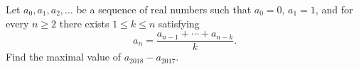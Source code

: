 Let $a_0, a_1, a_2, \dots$ be a sequence of real numbers such that $a_0 = 0$, $a_1 = 1$, and for every $n \ge 2$ there exists $1 \le k \le n$ satisfying
$$a_n = \dfrac{a_{n-1} + \cdots + a_{n-k}}{k}.$$
Find the maximal value of $a_{2018} - a_{2017}$.
